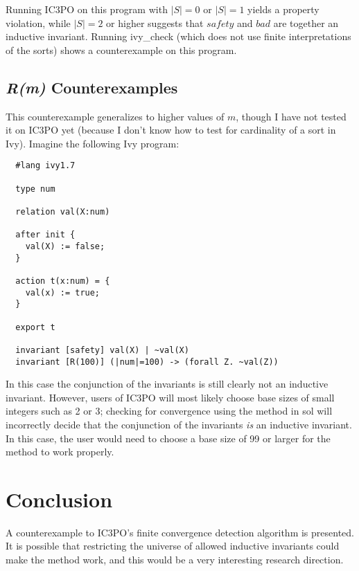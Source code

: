 \documentclass[12pt]{article}
\begin{document}
Running IC3PO on this program with $|S|=0$ or $|S|=1$ yields a property violation, while $|S|=2$ or higher suggests that $safety$ and $bad$ are together an inductive invariant.  Running ivy\_check (which does not use finite interpretations of the sorts) shows a counterexample on this program.

\subsection{\textit{R(m)} Counterexamples}
This counterexample generalizes to higher values of $m$, though I have not tested it on IC3PO yet (because I don't know how to test for cardinality of a sort in Ivy).  Imagine the following Ivy program:

\begin{verbatim}
  #lang ivy1.7

  type num

  relation val(X:num)

  after init {
    val(X) := false;
  }

  action t(x:num) = {
    val(x) := true;
  }

  export t

  invariant [safety] val(X) | ~val(X)
  invariant [R(100)] (|num|=100) -> (forall Z. ~val(Z))
\end{verbatim}

In this case the conjunction of the invariants is still clearly not an inductive invariant.  However, users of IC3PO will most likely choose base sizes of small integers such as 2 or 3; checking for convergence using the method in sol will incorrectly decide that the conjunction of the invariants \textit{is} an inductive invariant.  In this case, the user would need to choose a base size of 99 or larger for the method to work properly.

\section{Conclusion}
A counterexample to IC3PO's finite convergence detection algorithm is presented.  It is possible that restricting the universe of allowed inductive invariants could make the method work, and this would be a very interesting research direction.


%
%
\end{document}
